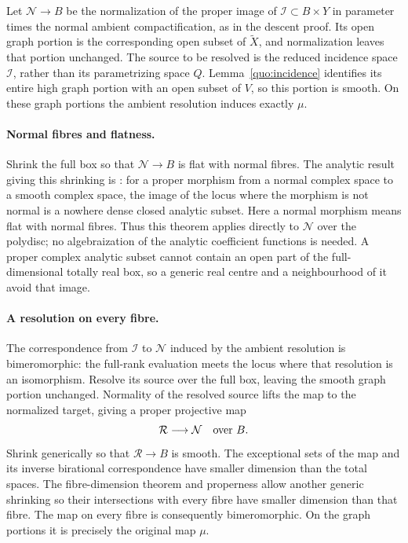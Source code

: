 Let \(\mathcal N\to B\) be the normalization of the proper
image of \(\mathcal I\subset B\times Y\) in parameter times
the normal ambient compactification, as in the descent proof.
Its open graph portion is the corresponding open subset of
\(\widetilde X\), and normalization leaves that portion unchanged.
The source to be resolved is the reduced incidence space
\(\mathcal I\), rather than its parametrizing space \(Q\).
Lemma~\ref{quo:incidence} identifies its entire high graph
portion with an open subset of \(V\), so this portion is smooth.
On these graph portions the ambient resolution induces exactly
\(\mu\).

\paragraph{Normal fibres and flatness.}
Shrink the full box so that \(\mathcal N\to B\) is flat with
normal fibres. The analytic result giving this shrinking is
\cite[Theorem~6.2(2)(ii), including the properness clause]{Greuel2017}:
for a proper morphism from a normal complex space to a smooth
complex space, the image of the locus where the morphism is not
normal is a nowhere dense closed analytic subset. Here a normal
morphism means flat with normal fibres. Thus this theorem applies
directly to \(\mathcal N\) over the polydisc;
no algebraization of the analytic coefficient functions is needed.
A proper complex analytic subset cannot contain an open part of
the full-dimensional totally real box, so a generic real centre
and a neighbourhood of it avoid that image.

\paragraph{A resolution on every fibre.}
The correspondence from \(\mathcal I\) to \(\mathcal N\)
induced by the ambient resolution is bimeromorphic: the full-rank
evaluation meets the locus where that resolution is an isomorphism.
Resolve its source over the full box, leaving the smooth graph
portion unchanged. Normality of the resolved source lifts the
map to the normalized target, giving a proper projective map
\[
                 \mathcal R\longrightarrow\mathcal N
                         \quad\hbox{over }B.
\]
Shrink generically so that \(\mathcal R\to B\) is smooth.
The exceptional sets of the map and its inverse birational
correspondence have smaller dimension than the total spaces.
The fibre-dimension theorem and properness allow another generic
shrinking so their intersections with every fibre have smaller
dimension than that fibre. The map on every fibre is consequently
bimeromorphic. On the graph portions it is precisely the original
map \(\mu\).

